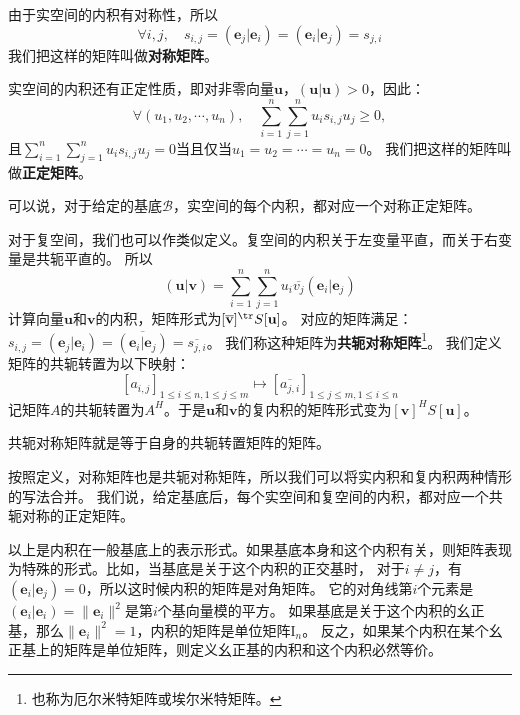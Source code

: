 \documentclass[12pt,UTF8]{ctexbook}
\begin{document}
由于实空间的内积有对称性，所以
$$\forall i, j, \quad s_{i,j} = (\mathbf{e}_j |\mathbf{e}_i ) = (\mathbf{e}_i |\mathbf{e}_j ) = s_{j,i}$$
我们把这样的矩阵叫做\textbf{对称矩阵}。

实空间的内积还有正定性质，即对非零向量$\mathbf{u}$，$(\mathbf{u} | \mathbf{u}) > 0$，因此：
$$\forall (u_1, u_2, \cdots, u_n), \quad \sum_{i=1}^n \sum_{j=1}^n u_i s_{i,j} u_j \geqslant 0,$$
且$\sum_{i=1}^n \sum_{j=1}^n u_i s_{i,j} u_j = 0$当且仅当$u_1 = u_2 = \cdots = u_n = 0$。
我们把这样的矩阵叫做\textbf{正定矩阵}。

可以说，对于给定的基底$\mathcal{B}$，实空间的每个内积，都对应一个对称正定矩阵。

对于复空间，我们也可以作类似定义。复空间的内积关于左变量平直，而关于右变量是共轭平直的。
所以
$$ ( \mathbf{u} |  \mathbf{v} ) = \sum_{i=1}^n \sum_{j=1}^n u_i \overline{v_j} (\mathbf{e}_i|\mathbf{e}_j) $$
计算向量$\mathbf{u}$和$\mathbf{v}$的内积，矩阵形式为$[\overline{\mathbf{v}}]^{\tr} S [\mathbf{u}]$。
对应的矩阵满足：$s_{i,j} = (\mathbf{e}_j|\mathbf{e}_i) = \overline{(\mathbf{e}_i|\mathbf{e}_j)} = \overline{s_{j,i}}$。
我们称这种矩阵为\textbf{共轭对称矩阵}\footnote{也称为厄尔米特矩阵或埃尔米特矩阵。}。
我们定义矩阵的共轭转置为以下映射：
$$ [a_{i,j}]_{1 \leqslant i \leqslant n, 1 \leqslant j \leqslant m} \mapsto [\overline{a_{j,i}}]_{1 \leqslant j \leqslant m, 1 \leqslant i \leqslant n}$$
记矩阵$A$的共轭转置为$A^H$。于是$\mathbf{u}$和$\mathbf{v}$的复内积的矩阵形式变为$[\mathbf{v}]^H S [\mathbf{u}]$。

共轭对称矩阵就是等于自身的共轭转置矩阵的矩阵。

按照定义，对称矩阵也是共轭对称矩阵，所以我们可以将实内积和复内积两种情形的写法合并。
我们说，给定基底后，每个实空间和复空间的内积，都对应一个共轭对称的正定矩阵。

以上是内积在一般基底上的表示形式。如果基底本身和这个内积有关，则矩阵表现为特殊的形式。比如，当基底是关于这个内积的正交基时，
对于$i \neq j$，有$(\mathbf{e}_i |\mathbf{e}_j ) = 0$，所以这时候内积的矩阵是对角矩阵。
它的对角线第$i$个元素是$(\mathbf{e}_i |\mathbf{e}_i) = \| \mathbf{e}_i \|^2$是第$i$个基向量模的平方。
如果基底是关于这个内积的幺正基，那么$\| \mathbf{e}_i \|^2 = 1$，内积的矩阵是单位矩阵$\mathrm{I}_n$。
反之，如果某个内积在某个幺正基上的矩阵是单位矩阵，则定义幺正基的内积和这个内积必然等价。
\end{document}
